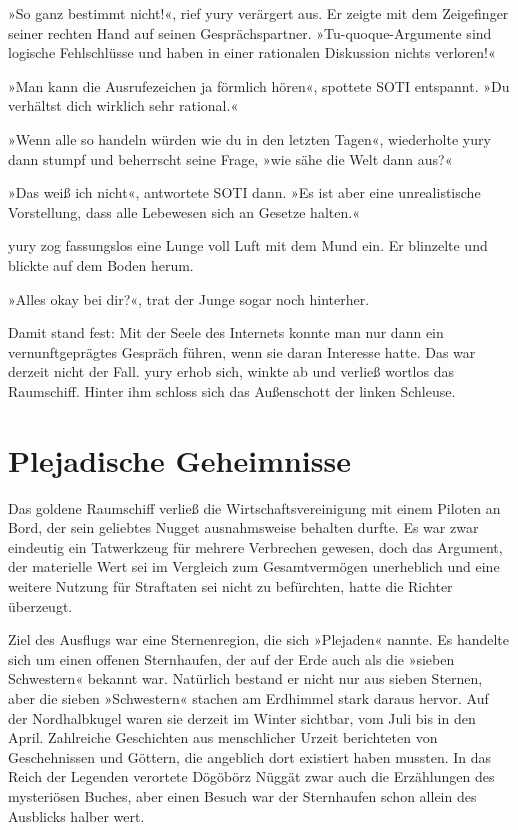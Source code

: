 »So ganz bestimmt nicht!«, rief yury verärgert aus. Er zeigte mit dem Zeigefinger seiner rechten Hand auf seinen Gesprächspartner. »Tu-quoque-Argumente sind logische Fehlschlüsse und haben in einer rationalen Diskussion nichts verloren!«

»Man kann die Ausrufezeichen ja förmlich hören«, spottete SOTI entspannt. »Du verhältst dich wirklich sehr rational.«

»Wenn alle so handeln würden wie du in den letzten Tagen«, wiederholte yury dann stumpf und beherrscht seine Frage, »wie sähe die Welt dann aus?«

»Das weiß ich nicht«, antwortete SOTI dann. »Es ist aber eine unrealistische Vorstellung, dass alle Lebewesen sich an Gesetze halten.«

yury zog fassungslos eine Lunge voll Luft mit dem Mund ein. Er blinzelte und blickte auf dem Boden herum.

»Alles okay bei dir?«, trat der Junge sogar noch hinterher.

Damit stand fest: Mit der Seele des Internets konnte man nur dann ein vernunftgeprägtes Gespräch führen, wenn sie daran Interesse hatte. Das war derzeit nicht der Fall. yury erhob sich, winkte ab und verließ wortlos das Raumschiff. Hinter ihm schloss sich das Außenschott der linken Schleuse.


\chapter{Plejadische Geheimnisse}

Das goldene Raumschiff verließ die Wirtschaftsvereinigung mit einem Piloten an Bord, der sein geliebtes Nugget ausnahmsweise behalten durfte. Es war zwar eindeutig ein Tatwerkzeug für mehrere Verbrechen gewesen, doch das Argument, der materielle Wert sei im Vergleich zum Gesamtvermögen unerheblich und eine weitere Nutzung für Straftaten sei nicht zu befürchten, hatte die Richter überzeugt.

Ziel des Ausflugs war eine Sternenregion, die sich »Plejaden« nannte. Es handelte sich um einen offenen Sternhaufen, der auf der Erde auch als die »sieben Schwestern« bekannt war. Natürlich bestand er nicht nur aus sieben Sternen, aber die sieben »Schwestern« stachen am Erdhimmel stark daraus hervor. Auf der Nordhalbkugel waren sie derzeit im Winter sichtbar, vom Juli bis in den April. Zahlreiche Geschichten aus menschlicher Urzeit berichteten von Geschehnissen und Göttern, die angeblich dort existiert haben mussten. In das Reich der Legenden verortete Dögöbörz Nüggät zwar auch die Erzählungen des mysteriösen Buches, aber einen Besuch war der Sternhaufen schon allein des Ausblicks halber wert.

